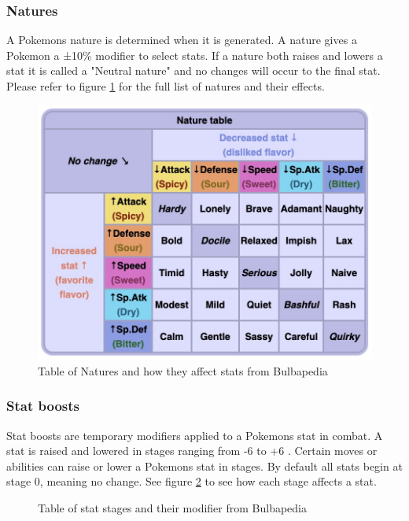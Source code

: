 \subsubsection{Natures}
A Pokemons nature \cite{Natures} is determined when it is generated. A nature gives a Pokemon a ±10\% modifier to select stats.
If a nature both raises and lowers a stat it is called a "Neutral nature" and no changes will occur to the final stat.
Please refer to figure \ref{tab:nature-table} for the full list of natures and their effects.
\begin{figure}[H]
  \centering
  \includegraphics[width=.8\textwidth]{assets/nature-stat-table.jpg}
  \caption{Table of Natures and how they affect stats from Bulbapedia \cite{Natures}}
  \label{tab:nature-table}
\end{figure}

\subsubsection{Stat boosts}
Stat boosts are temporary modifiers applied to a Pokemons stat in combat. A stat is raised and lowered in stages ranging from -6 to +6 \cite{StatBoosts}.
Certain moves or abilities can raise or lower a Pokemons stat in stages. By default all stats begin at stage 0, meaning no change. 
See figure \ref{tab:stat-stage-modifiers} to see how each stage affects a stat.

\begin{figure}[H]
  \centering
  \caption{Table of stat stages and their modifier from Bulbapedia \cite{StatBoosts}}
  \label{tab:stat-stage-modifiers}

\end{figure}

